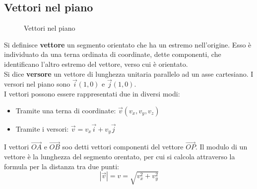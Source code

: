 \documentclass{article}     %
\begin{document}
        \subsection{Vettori nel piano}
            \begin{wrapfigure}{r}{0.30\textwidth}
                    \caption{Vettori nel piano}
            \end{wrapfigure}

            Si definisce \textbf{vettore} un segmento orientato che ha un estremo nell'origine. Esso è individuato da una terna ordinata di coordinate, dette componenti, che identificano l'altro estremo del vettore, verso cui è orientato. \\
            Si dice \textbf{versore} un vettore di lunghezza unitaria parallelo ad un asse cartesiano. I versori nel piano sono $\overrightarrow{i}(1,0)$ e $\overrightarrow{j}(1,0)$.\\
            I vettori possono essere rappresentati due in diversi modi:
            \begin{itemize}
                \item Tramite una terna di coordinate: $\overrightarrow{v}(v_x, v_y, v_z)$
                \item Tramite i versori: $\overrightarrow{v}=v_x\overrightarrow{i}+v_y\overrightarrow{j}$
            \end{itemize}
            I vettori $\overrightarrow{OA}$ e $\overrightarrow{OB}$ soo detti vettori componenti del vettore $\overrightarrow{OP}$.
            Il modulo di un vettore è la lunghezza del segmento orentato, per cui si calcola attraverso la formula per la distanza tra due punti:
            \[|\overrightarrow{v}|=v=\sqrt{v_x^2+v_y^2}\]
\end{document}
